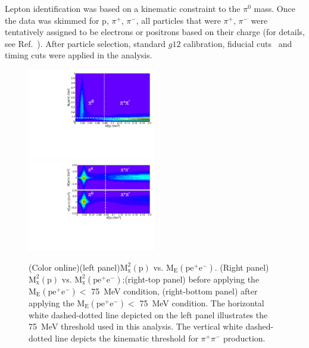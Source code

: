 \documentclass[aps,prc,twocolumn,floatfix,showpacs,preprintnumbers,amsmath,amssymb,superscriptaddress,linenumbers]{revtex4-1}
\begin{document}
Lepton identification was based on a kinematic constraint to the $\pi^0$ mass. Once the data was skimmed for p, $\pi^+$, $\pi^-$, 
all particles that were $\pi^+$, $\pi^-$ were tentatively assigned 
to be electrons or positrons based on their charge (for details, 
see Ref.~\cite{Kunkel}).  After particle selection, standard $g12$ 
calibration, fiducial cuts~\cite{g12} and timing cuts were applied 
in the analysis.
\begin{figure}[htb!]
        \centerline{
               \includegraphics[height=0.35\textwidth,width=0.5\textwidth]{ME_vs_mxpcompare.pdf}\hfill
               \includegraphics[height=0.35\textwidth,width=0.5\textwidth]{mm2_vs_mxp_compare.pdf}}

        \caption{(Color online)(left panel)$\mathrm{M_x^2(p)}$ vs.
        $\mathrm{M_E(pe^+e^-)}$. (Right panel)$\mathrm{M_x^2(p)}$ vs.
        $\mathrm{M_x^2(pe^+e^-)}$;(right-top panel) before applying the
        $\mathrm{M_E(pe^+e^-)} <$ 75~MeV condition, (right-bottom panel)
        after applying the $\mathrm{M_E(pe^+e^-)} <$ 75~MeV condition.
        The horizontal white dashed-dotted line depicted on the left
        panel illustrates the 75~MeV threshold used in this analysis.
        The vertical white dashed-dotted line depicts the kinematic
        threshold for $\pi^+\pi^-$ production.
        }\label{fig:sys}
\end{figure}
\end{document}
